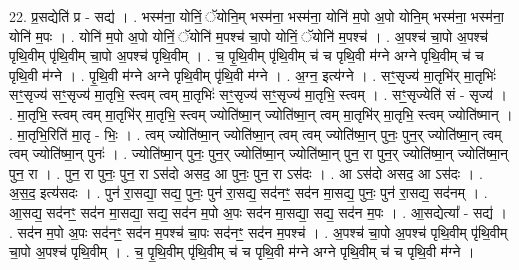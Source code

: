 \documentclass[17pt]{extarticle}
\begin{document}
22. प्र॒सद्येति॑ प्र - सद्य॑ । . भस्म॑ना॒ योनिं॒ ॅयोनि॒म् भस्म॑ना॒ भस्म॑ना॒ योनि॑ म॒पो अ॒पो योनि॒म् भस्म॑ना॒ भस्म॑ना॒ योनि॑ म॒पः । . योनि॑ म॒पो अ॒पो योनिं॒ ॅयोनि॑ म॒पश्च॑ चा॒पो योनिं॒ ॅयोनि॑ म॒पश्च॑ । . अ॒पश्च॑ चा॒पो अ॒पश्च॑ पृथि॒वीम् पृ॑थि॒वीम् चा॒पो अ॒पश्च॑ पृथि॒वीम् । . च॒ पृ॒थि॒वीम् पृ॑थि॒वीम् च॑ च पृथि॒वी म॑ग्ने अग्ने पृथि॒वीम् च॑ च पृथि॒वी म॑ग्ने । . पृ॒थि॒वी म॑ग्ने अग्ने पृथि॒वीम् पृ॑थि॒वी म॑ग्ने । . अ॒ग्न॒ इत्य॑ग्ने । . सꣳ॒॒सृज्य॑ मा॒तृभि॑र् मा॒तृभिः॑ सꣳ॒॒सृज्य॑ सꣳ॒॒सृज्य॑ मा॒तृभि॒ स्त्वम् त्वम् मा॒तृभिः॑ सꣳ॒॒सृज्य॑ सꣳ॒॒सृज्य॑ मा॒तृभि॒ स्त्वम् । . सꣳ॒॒सृज्येति॑ सं - सृज्य॑ । . मा॒तृभि॒ स्त्वम् त्वम् मा॒तृभि॑र् मा॒तृभि॒ स्त्वम् ज्योति॑ष्मा॒न् ज्योति॑ष्मा॒न् त्वम् मा॒तृभि॑र् मा॒तृभि॒ स्त्वम् ज्योति॑ष्मान् । . मा॒तृभि॒रिति॑ मा॒तृ - भिः॒ । . त्वम् ज्योति॑ष्मा॒न् ज्योति॑ष्मा॒न् त्वम् त्वम् ज्योति॑ष्मा॒न् पुनः॒ पुन॒र् ज्योति॑ष्मा॒न् त्वम् त्वम् ज्योति॑ष्मा॒न् पुनः॑ । . ज्योति॑ष्मा॒न् पुनः॒ पुन॒र् ज्योति॑ष्मा॒न् ज्योति॑ष्मा॒न् पुन॒ रा पुन॒र् ज्योति॑ष्मा॒न् ज्योति॑ष्मा॒न् पुन॒ रा । . पुन॒ रा पुनः॒ पुन॒ रा ऽस॑दो असद॒ आ पुनः॒ पुन॒ रा ऽस॑दः । . आ ऽस॑दो असद॒ आ ऽस॑दः । . अ॒स॒द॒ इत्य॑सदः । . पुन॑ रा॒सद्या॒ सद्य॒ पुनः॒ पुन॑ रा॒सद्य॒ सद॑नꣳ॒॒ सद॑न मा॒सद्य॒ पुनः॒ पुन॑ रा॒सद्य॒ सद॑नम् । . आ॒सद्य॒ सद॑नꣳ॒॒ सद॑न मा॒सद्या॒ सद्य॒ सद॑न म॒पो अ॒पः सद॑न मा॒सद्या॒ सद्य॒ सद॑न म॒पः । . आ॒सद्येत्या᳚ - सद्य॑ । . सद॑न म॒पो अ॒पः सद॑नꣳ॒॒ सद॑न म॒पश्च॑ चा॒पः सद॑नꣳ॒॒ सद॑न म॒पश्च॑ । . अ॒पश्च॑ चा॒पो अ॒पश्च॑ पृथि॒वीम् पृ॑थि॒वीम् चा॒पो अ॒पश्च॑ पृथि॒वीम् । . च॒ पृ॒थि॒वीम् पृ॑थि॒वीम् च॑ च पृथि॒वी म॑ग्ने अग्ने पृथि॒वीम् च॑ च पृथि॒वी म॑ग्ने । \newline
\end{document}
